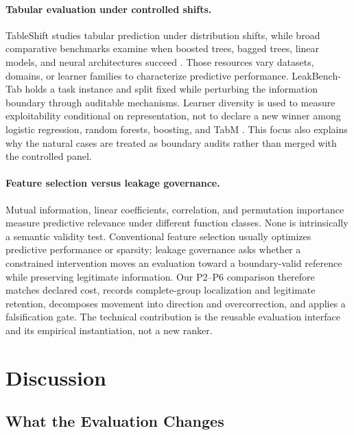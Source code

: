 \documentclass[sigconf,review]{acmart}
\begin{document}
\paragraph{Tabular evaluation under controlled shifts.}
TableShift studies tabular prediction under distribution shifts, while broad
comparative benchmarks examine when boosted trees, bagged trees, linear models,
and neural architectures succeed \cite{gardner2023tableshift,
mcelfresh2023tabzilla,grinsztajn2022trees}. Those resources vary datasets,
domains, or learner families to characterize predictive performance.
LeakBench-Tab holds a task instance and split fixed while perturbing the
information boundary through auditable mechanisms. Learner diversity is used
to measure exploitability conditional on representation, not to declare a new
winner among logistic regression, random forests, boosting, and TabM
\cite{breiman2001random,prokhorenkova2018catboost,ke2017lightgbm,
gorishniy2025tabm}. This focus also explains why the natural cases are treated
as boundary audits rather than merged with the controlled panel.

\paragraph{Feature selection versus leakage governance.}
Mutual information, linear coefficients, correlation, and permutation
importance measure predictive relevance under different function classes.
None is intrinsically a semantic validity test. Conventional feature selection
usually optimizes predictive performance or sparsity; leakage governance asks
whether a constrained intervention moves an evaluation toward a boundary-valid
reference while preserving legitimate information. Our P2--P6 comparison
therefore matches declared cost, records complete-group localization and
legitimate retention, decomposes movement into direction and overcorrection,
and applies a falsification gate. The technical contribution is the reusable
evaluation interface and its empirical instantiation, not a new ranker.

\section{Discussion}

\subsection{What the Evaluation Changes}
\end{document}
